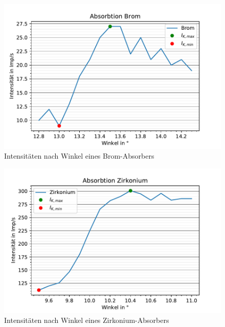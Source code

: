   \begin{figure}
    \centering
    \includegraphics{AbsorbtionsspektrumBrom.pdf}
    \caption{Intensitäten nach Winkel eines Brom-Absorbers}
    \label{fig:EmspektrumIII}
  \end{figure}

  \begin{figure}
    \centering
    \includegraphics{AbsorbtionsspektrumZirkonium.pdf}
    \caption{Intensitäten nach Winkel eines Zirkonium-Absorbers}
    \label{fig:EmspektrumIV}
  \end{figure}

